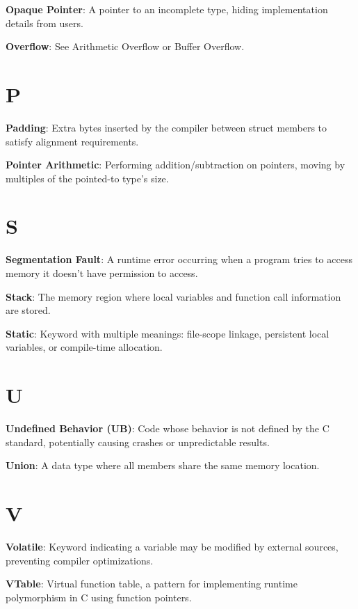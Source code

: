 \documentclass[11pt,openany]{book}
\begin{document}
\textbf{Opaque Pointer}: A pointer to an incomplete type, hiding implementation details from users.

\textbf{Overflow}: See Arithmetic Overflow or Buffer Overflow.

\section*{P}

\textbf{Padding}: Extra bytes inserted by the compiler between struct members to satisfy alignment requirements.

\textbf{Pointer Arithmetic}: Performing addition/subtraction on pointers, moving by multiples of the pointed-to type's size.

\section*{S}

\textbf{Segmentation Fault}: A runtime error occurring when a program tries to access memory it doesn't have permission to access.

\textbf{Stack}: The memory region where local variables and function call information are stored.

\textbf{Static}: Keyword with multiple meanings: file-scope linkage, persistent local variables, or compile-time allocation.

\section*{U}

\textbf{Undefined Behavior (UB)}: Code whose behavior is not defined by the C standard, potentially causing crashes or unpredictable results.

\textbf{Union}: A data type where all members share the same memory location.

\section*{V}

\textbf{Volatile}: Keyword indicating a variable may be modified by external sources, preventing compiler optimizations.

\textbf{VTable}: Virtual function table, a pattern for implementing runtime polymorphism in C using function pointers.
\end{document}
